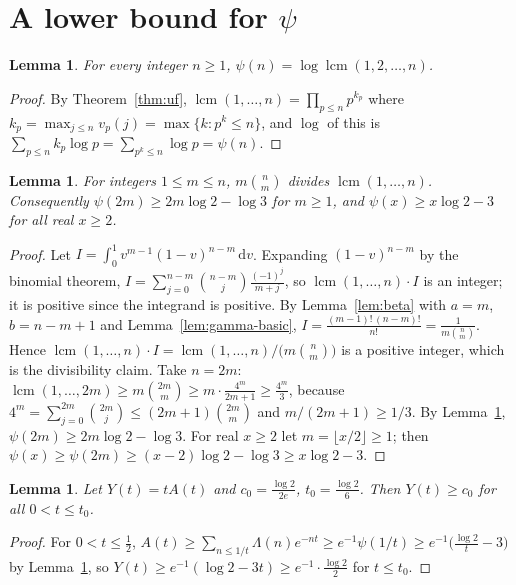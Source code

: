 \documentclass[11pt]{article}
\newtheorem{lemma}[theorem]{Lemma}
\theoremstyle{definition}
\newcommand{\Lam}{\Lambda}
\newcommand{\lcm}{\operatorname{lcm}}
\newcommand{\dd}{\,\mathrm{d}}
\begin{document}
\section{A lower bound for \texorpdfstring{$\psi$}{psi}}\label{sec:cheb}

\begin{lemma}\label{lem:psi-lcm}
For every integer $n\ge1$, $\psi(n)=\log\lcm(1,2,\dots,n)$.
\end{lemma}
\begin{proof}
By Theorem~\ref{thm:uf}, $\lcm(1,\dots,n)=\prod_{p\le n}p^{k_p}$ where $k_p=\max_{j\le n}v_p(j)=\max\{k:p^{k}\le n\}$, and $\log$ of this is $\sum_{p\le n}k_p\log p=\sum_{p^{k}\le n}\log p=\psi(n)$.
\end{proof}

\begin{lemma}\label{lem:nair}
For integers $1\le m\le n$, $m\binom nm$ divides $\lcm(1,\dots,n)$. Consequently $\psi(2m)\ge 2m\log2-\log3$ for $m\ge1$, and $\psi(x)\ge x\log2-3$ for all real $x\ge2$.
\end{lemma}
\begin{proof}
Let $I=\int_0^1 v^{m-1}(1-v)^{n-m}\dd v$. Expanding $(1-v)^{n-m}$ by the binomial theorem,
$I=\sum_{j=0}^{n-m}\binom{n-m}{j}\frac{(-1)^{j}}{m+j}$, so $\lcm(1,\dots,n)\cdot I$ is an integer; it is positive since the integrand is positive.
By Lemma~\ref{lem:beta} with $a=m$, $b=n-m+1$ and Lemma~\ref{lem:gamma-basic}, $I=\frac{(m-1)!\,(n-m)!}{n!}=\frac{1}{m\binom nm}$.
Hence $\lcm(1,\dots,n)\cdot I=\lcm(1,\dots,n)/\bigl(m\binom nm\bigr)$ is a positive integer, which is the divisibility claim.
Take $n=2m$: $\lcm(1,\dots,2m)\ge m\binom{2m}{m}\ge m\cdot\frac{4^{m}}{2m+1}\ge\frac{4^{m}}{3}$,
because $4^{m}=\sum_{j=0}^{2m}\binom{2m}{j}\le(2m+1)\binom{2m}{m}$ and $m/(2m+1)\ge1/3$.
By Lemma~\ref{lem:psi-lcm}, $\psi(2m)\ge2m\log2-\log3$.
For real $x\ge2$ let $m=\lfloor x/2\rfloor\ge1$; then $\psi(x)\ge\psi(2m)\ge(x-2)\log2-\log3\ge x\log2-3$.
\end{proof}

\begin{lemma}\label{lem:Y-lower}
Let $Y(t)=tA(t)$ and $c_0=\frac{\log 2}{2e}$, $t_0=\frac{\log2}{6}$. Then $Y(t)\ge c_0$ for all $0<t\le t_0$.
\end{lemma}
\begin{proof}
For $0<t\le\tfrac12$, $A(t)\ge\sum_{n\le1/t}\Lam(n)e^{-nt}\ge e^{-1}\psi(1/t)\ge e^{-1}\bigl(\tfrac{\log2}{t}-3\bigr)$ by Lemma~\ref{lem:nair}, so $Y(t)\ge e^{-1}(\log2-3t)\ge e^{-1}\cdot\tfrac{\log2}{2}$ for $t\le t_0$.
\end{proof}
\end{document}
